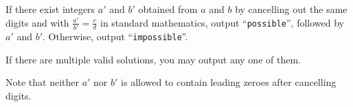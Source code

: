 
If there exist integers $a'$ and $b'$ obtained from $a$ and $b$ by cancelling
out the same digits and with $\frac{a'}{b'} = \frac{c}{d}$ in standard mathematics, output
``\texttt{possible}'', followed by $a'$ and $b'$.
Otherwise, output ``\texttt{impossible}''.

If there are multiple valid solutions, you may output any one of them.

Note that neither $a'$ nor $b'$ is allowed to contain leading zeroes after
cancelling digits.
